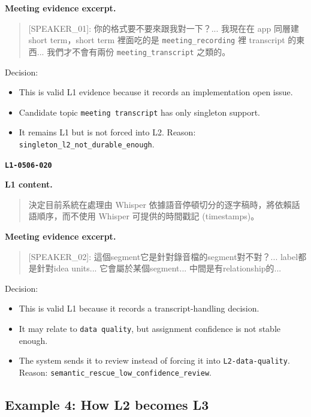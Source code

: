 \documentclass[11pt,a4paper]{article}
\newcommand{\code}[1]{{\footnotesize\texttt{#1}}}
\begin{document}
\textbf{Meeting evidence excerpt.}

\begin{quote}
[SPEAKER\_01]: 你的格式要不要來跟我對一下？... 我現在在 app 同層建 short term，short term 裡面吃的是 \code{meeting\_recording} 裡 transcript 的東西... 我們才不會有兩份 \code{meeting\_transcript} 之類的。
\end{quote}

Decision:

\begin{itemize}
  \item This is valid L1 evidence because it records an implementation open issue.
  \item Candidate topic \code{meeting transcript} has only singleton support.
  \item It remains L1 but is not forced into L2. Reason: \code{singleton\_l2\_not\_durable\_enough}.
\end{itemize}

\textbf{\code{L1-0506-020}}

\textbf{L1 content.}

\begin{quote}
決定目前系統在處理由 Whisper 依據語音停頓切分的逐字稿時，將依賴話語順序，而不使用 Whisper 可提供的時間戳記 (timestamps)。
\end{quote}

\textbf{Meeting evidence excerpt.}

\begin{quote}
[SPEAKER\_02]: 這個segment它是針對錄音檔的segment對不對？... label都是針對idea units... 它會屬於某個segment... 中間是有relationship的...
\end{quote}

Decision:

\begin{itemize}
  \item This is valid L1 because it records a transcript-handling decision.
  \item It may relate to \code{data quality}, but assignment confidence is not stable enough.
  \item The system sends it to review instead of forcing it into \code{L2-data-quality}. Reason: \code{semantic\_rescue\_low\_confidence\_review}.
\end{itemize}

\subsection{Example 4: How L2 becomes L3}
\end{document}
